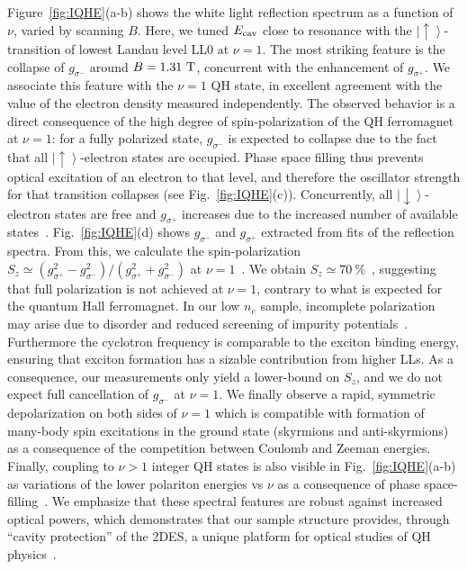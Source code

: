 \documentclass[prl,twocolumn,10pt,showpacs,superscriptaddress,longbibliography,footnoteinbib]{revtex4-1}
\begin{document}
Figure~\ref{fig:IQHE}(a-b) shows the white light reflection spectrum as a function of $\nu$, varied by scanning $B$. Here, we tuned $E_{\rm cav}$ close to resonance with the $\left | \uparrow \right >$-transition of lowest Landau level LL0 at $\nu=1$. The most striking feature is the collapse of $g_{\sigma^-}$ around $B=1.31~{\rm T}$, concurrent with the enhancement of $g_{\sigma^+}$. We associate this feature with the $\nu=1$ QH state, in excellent agreement with the value of the electron density measured independently. The observed behavior is a direct consequence of the high degree of spin-polarization of the QH ferromagnet at $\nu = 1$: for a fully polarized state, $g_{\sigma^-}$ is expected to collapse due to the fact that all $\left | \uparrow \right >$-electron states are occupied. Phase space filling thus prevents optical excitation of an electron to that level, and therefore the oscillator strength for that transition collapses (see Fig.~\ref{fig:IQHE}(c)). Concurrently, all $\left | \downarrow \right >$-electron states are free and $g_{\sigma^+}$ increases due to the increased number of available states~\cite{Aifer1996,Groshaus2004}. Fig.~\ref{fig:IQHE}(d) shows $g_{\sigma^-}$ and $g_{\sigma^+}$ extracted from fits of the reflection spectra. From this, we calculate the spin-polarization $S_z \simeq ( g_{\sigma^+}^2 - g_{\sigma^-}^2 ) / ( g_{\sigma^+}^2 + g_{\sigma^-}^2 )$ at $\nu=1$~\cite{Groshaus2007,Smolka2014}. We obtain $S_z \simeq 70~\%$~\cite{Supplemental}, suggesting that full polarization is not achieved at $\nu=1$, contrary to what is expected for the quantum Hall ferromagnet. In our low $n_e$ sample, incomplete polarization may arise due to disorder and reduced screening of impurity potentials~\cite{Manfra1997}. Furthermore the cyclotron frequency is comparable to the exciton binding energy, ensuring that exciton formation has a sizable contribution from higher LLs. As a consequence, our measurements only yield a lower-bound on $S_z$, and we do not expect full cancellation of $g_{\sigma^-}$ at $\nu=1$. We finally observe a rapid, symmetric depolarization on both sides of $\nu=1$ which is compatible with formation of many-body spin excitations in the ground state (skyrmions and anti-skyrmions)~\cite{Aifer1996,Manfra1997,Zhitomirsky2002,Groshaus2004,Plochocka2009} as a consequence of the competition between Coulomb and Zeeman energies. Finally, coupling to $\nu > 1$ integer QH states is also visible in Fig.~\ref{fig:IQHE}(a-b) as variations of the lower polariton energies vs $\nu$ as a consequence of phase space-filling~\cite{Supplemental}. We emphasize that these spectral features are robust against increased optical powers, which demonstrates that our sample structure provides, through ``cavity protection'' of the 2DES, a unique platform for optical studies of QH physics~\cite{Supplemental}.
\end{document}
